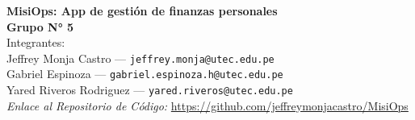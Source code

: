 \begin{center}
    {\Large \textbf{MisiOps: App de gestión de finanzas personales}} \\[0.2cm]
    \textbf{Grupo N° 5} \\[0.1cm]
    \vspace{0.2cm}
    Integrantes: \\
    Jeffrey Monja Castro --- \texttt{jeffrey.monja@utec.edu.pe} \\
    Gabriel Espinoza  --- \texttt{gabriel.espinoza.h@utec.edu.pe} \\
    Yared Riveros Rodriguez --- \texttt{yared.riveros@utec.edu.pe} \\[0.2cm]
    \textit{Enlace al Repositorio de Código:} \url{https://github.com/jeffreymonjacastro/MisiOps}
\end{center}
